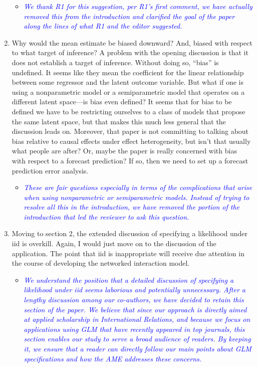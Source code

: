 \begin{enumerate}
	\begin{itemize}
		\item  \emph{ \textcolor{blue}{
		We thank R1 for this suggestion, per R1's first comment, we have actually removed this from the introduction and clarified the goal of the paper along the lines of what R1 and the editor suggested.
		}}
	\end{itemize}
	\item Why would the mean estimate be biased downward?  And, biased with respect to what target of inference?  A problem with the opening discussion is that it does not establish a target of inference.  Without doing so, ``bias'' is undefined.  It seems like they mean the coefficient for the linear relationship between some regressor and the latent outcome variable. But what if one is using a nonparametric model or a semiparametric model that operates on a different latent space---is bias even defined?  It seems that for bias to be defined we have to be restricting ourselves to a class of models that propose the same latent space, but that makes this much less general that the discussion leads on.  Moreover, that paper is not committing to talking about bias relative to causal effects under effect heterogeneity, but isn't that usually what people are after?  Or, maybe the paper is really concerned with bias with respect to a forecast prediction? If so, then we need to set up a forecast prediction error analysis.
	\begin{itemize}
		\item  \emph{ \textcolor{blue}{
		These are fair questions especially in terms of the complications that arise when using nonparametric or semiparametric models. Instead of trying to resolve all this in the introduction, we have removed the portion of the introduction that led the reviewer to ask this question.
		}}
	\end{itemize}
	\item Moving to section 2, the extended discussion of specifying a likelihood under iid is overkill.  Again, I would just move on to the discussion of the application. The point that iid is inappropriate will receive due attention in the course of developing the networked interaction model.
	\begin{itemize}
		\item  \emph{ \textcolor{blue}{
		We understand the position that a detailed discussion of specifying a likelihood under iid seems laborious and potentially unnecessary. After a lengthy discussion among our co-authors, we have decided to retain this section of the paper. We believe that since our approach is directly aimed at applied scholarship in International Relations, and because we focus on applications using GLM that have recently appeared in top journals, this section enables our study to serve a broad audience of readers. By keeping it, we ensure that a reader can directly follow our main points about GLM specifications and how the AME addresses these concerns. 
}}
\end{itemize}
\end{enumerate}
